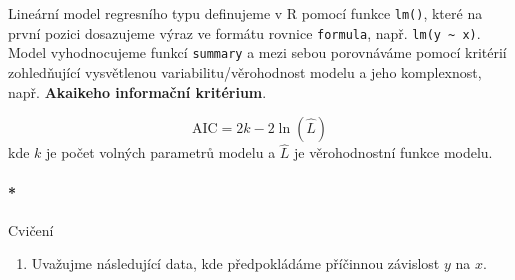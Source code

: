 \documentclass[
  letterpaper,
  DIV=11,
  numbers=noendperiod]{scrreprt}
\let\oldparagraph\paragraph
\renewcommand{\paragraph}[1]{\oldparagraph{#1}\mbox{}}
\providecommand{\tightlist}{%
  \setlength{\itemsep}{0pt}\setlength{\parskip}{0pt}}\usepackage{longtable,booktabs,array}
\begin{document}
Lineární model regresního typu definujeme v R pomocí funkce
\texttt{lm()}, které na první pozici dosazujeme výraz ve formátu rovnice
\texttt{formula}, např. \texttt{lm(y\ \textasciitilde{}\ x)}. Model
vyhodnocujeme funkcí \texttt{summary} a mezi sebou porovnáváme pomocí
kritérií zohledňující vysvětlenou variabilitu/věrohodnost modelu a jeho
komplexnost, např. \textbf{Akaikeho informační kritérium}.

\[
\text{AIC} = 2k - 2\ln(\hat{L})
\] kde \(k\) je počet volných parametrů modelu a \(\hat{L}\) je
věrohodnostní funkce modelu.

\hypertarget{cviux10denuxed-8}{%
\paragraph*{Cvičení}\label{cviux10denuxed-8}}

\begin{enumerate}
\def\labelenumi{\arabic{enumi}.}
\tightlist
\item
  Uvažujme následující data, kde předpokládáme příčinnou závislost \(y\)
  na \(x\).
\end{enumerate}
\end{document}
